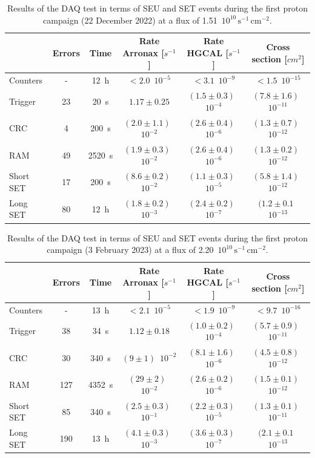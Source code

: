 \begin{table}
    \centering
    \begin{tabular}{ l | c | c | c | c | c }
        \hline
        \hline
        & Errors & Time & Rate Arronax [$s^{-1}$] & Rate HGCAL [$s^{-1}$] & Cross section [$cm^{2}$]\\
        \hline
        Counters & - & 12~h & $<2.0$~$10^{-5}$ & $<3.1$~$10^{-9}$ & $<1.5$~$10^{-15}$\\
        Trigger & 23 & 20~s & $1.17\pm0.25$ & $(1.5\pm0.3)$~$10^{-4}$ & $(7.8\pm1.6)$~$10^{-11}$ \\
        CRC & 4 & 200~s & $(2.0\pm1.1)$~$10^{-2}$ & $(2.6\pm0.4)$~$10^{-6}$ & $(1.3\pm0.7)$~$10^{-12}$\\
        RAM & 49 & 2520~s & $(1.9\pm0.3)$~$10^{-2}$ & $(2.6\pm0.4)$~$10^{-6}$ & $(1.3\pm0.2)$~$10^{-12}$\\
        Short SET & 17 & 200~s & $(8.6\pm0.2)$~$10^{-2}$ & $(1.1\pm0.3)$~$10^{-5}$ & $(5.8\pm1.4)$~$10^{-12}$ \\
        Long SET & 80 & 12~h & $(1.8\pm0.2)$~$10^{-3}$ & $(2.4\pm0.2)$~$10^{-7}$ & $(1.2\pm0.1$~$10^{-13}$ \\
        \hline
        \hline
    \end{tabular}
    \caption{Results of the DAQ test in terms of SEU and SET events during the first proton campaign (22 December 2022) at a flux of 1.51~$10^{10}\,\textrm{s}^{-1}\,\textrm{cm}^{-2}$.}
    \label{tab:SEE_protons1}
\end{table}

\begin{table}
    \centering
    \begin{tabular}{ l | c | c | c | c | c }
        \hline
        \hline
        & Errors & Time & Rate Arronax [$s^{-1}$] & Rate HGCAL [$s^{-1}$] & Cross section [$cm^{2}$]\\
        \hline
        Counters & - & 13~h & $<2.1$~$10^{-5}$ & $<1.9$~$10^{-9}$ & $<9.7$~$10^{-16}$\\
        Trigger & 38 & 34~s & $1.12\pm0.18$ & $(1.0\pm0.2)$~$10^{-4}$ & $(5.7\pm0.9)$~$10^{-11}$ \\
        CRC & 30 & 340~s & $(9\pm1)$~$10^{-2}$ & $(8.1\pm1.6)$~$10^{-6}$ & $(4.5\pm0.8)$~$10^{-12}$\\
        RAM & 127 & 4352~s & $(29\pm2)$~$10^{-2}$ & $(2.6\pm0.2)$~$10^{-6}$ & $(1.5\pm0.1)$~$10^{-12}$\\
        Short SET & 85 & 340~s & $(2.5\pm0.3)$~$10^{-1}$ & $(2.2\pm0.3)$~$10^{-5}$ & $(1.3\pm0.1)$~$10^{-11}$ \\
        Long SET & 190 & 13~h & $(4.1\pm0.3)$~$10^{-3}$ & $(3.6\pm0.3)$~$10^{-7}$ & $(2.1\pm0.1$~$10^{-13}$ \\
        \hline
        \hline
    \end{tabular}
    \caption{Results of the DAQ test in terms of SEU and SET events during the first proton campaign (3 February 2023) at a flux of 2.20~$10^{10}\,\textrm{s}^{-1}\,\textrm{cm}^{-2}$.}
    \label{tab:SEE_protons2}
\end{table}

